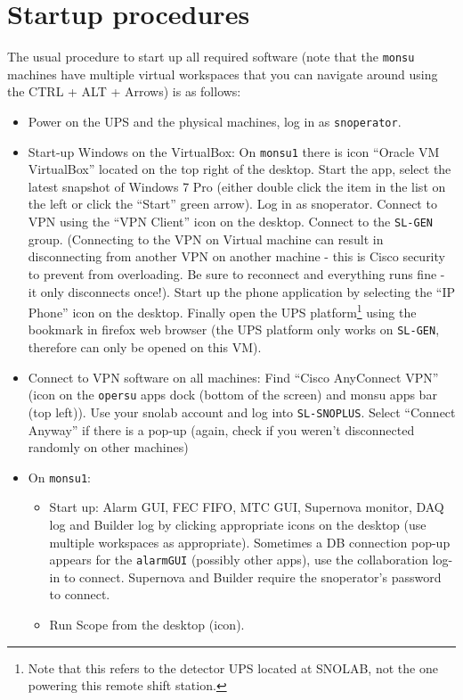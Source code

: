 \documentclass[12pt, a4paper]{article}
\begin{document}
\section{Startup procedures}
The usual procedure to start up all required software (note that the {\tt monsu} machines have multiple virtual workspaces that you can navigate around using the CTRL + ALT + Arrows) is as follows:
\begin{itemize}
	\item Power on the UPS and the physical machines, log in as {\tt snoperator}.
	\item Start-up Windows on the VirtualBox: On {\tt monsu1} there is icon ``Oracle VM VirtualBox'' located on the top right of the desktop. Start the app, select the latest snapshot of Windows 7 Pro (either double click the item in the list on the left or click the ``Start'' green arrow). Log in as snoperator. Connect to VPN using the ``VPN Client'' icon on the desktop. Connect to the {\tt SL-GEN} group. (Connecting to the VPN on Virtual machine can result in disconnecting from another VPN on another machine - this is Cisco security to prevent from overloading. Be sure to reconnect and everything runs fine - it only disconnects once!). Start up the phone application by selecting the ``IP Phone'' icon on the desktop. Finally open the UPS platform\footnote{Note that this refers to the detector UPS located at SNOLAB, not the one powering this remote shift station.} using the bookmark in firefox web browser (the UPS platform only works on {\tt SL-GEN}, therefore can only be opened on this VM).
	\item Connect to VPN software on all machines: Find ``Cisco AnyConnect VPN'' (icon on the {\tt opersu} apps dock (bottom of the screen) and monsu apps bar (top left)). Use your snolab account and log into {\tt SL-SNOPLUS}. Select ``Connect Anyway'' if there is a pop-up (again, check if you weren't disconnected randomly on other machines)
	\item On {\tt monsu1}:
	\begin{itemize}
		\item Start up: Alarm GUI, FEC FIFO, MTC GUI, Supernova monitor, DAQ log and Builder log by clicking appropriate icons on the desktop (use multiple workspaces as appropriate). Sometimes a DB connection pop-up appears for the {\tt alarmGUI} (possibly other apps), use the collaboration log-in to connect. Supernova and Builder require the snoperator's password to connect.		
			\item Run Scope from the desktop (icon).

\end{itemize}
\end{itemize}
\end{document}
